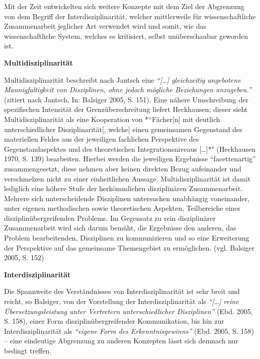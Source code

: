\documentclass[a4paper,
fontsize=11pt,
oneside,
numbers=noperiodatend,
parskip=half-,
bibliography=totoc,
final
]{scrartcl}
\begin{document}
Mit der Zeit entwickelten sich weitere Konzepte mit dem Ziel der
Abgrenzung von dem Begriff der Interdisziplinarität, welcher
mittlerweile für wissenschaftliche Zusammenarbeit jeglicher Art
verwendet wird und somit, wie das wissenschaftliche System, welches es
kritisiert, selbst unüberschaubar geworden ist.

\textbf{Multidisziplinarität}

Multidisziplinarität beschreibt nach Jantsch eine
\emph{\enquote{{[}\ldots{}{]} gleichzeitig angebotene Mannigfaltigkeit
von Disziplinen, ohne jedoch mögliche Beziehungen anzugeben.}} (zitiert
nach Jantsch, In: Balsiger 2005, S. 151). Eine nähere Umschreibung der
spezifischen Intensität der Grenzüberschreitung liefert Heckhausen;
dieser sieht Multidisziplinarität als eine Kooperation von
*``Fächer{[}n{]} mit deutlich unterschiedlicher Disziplinarität{[},
welche{]} einen gemeinsamen Gegenstand des materiellen Feldes aus der
jeweiligen fachlichen Perspektive des Gegenstandaspektes und des
theoretischen Integrationsniveaus {[}\ldots{}{]}*" (Heckhausen 1970, S.
139) bearbeiten. Hierbei werden die jeweiligen Ergebnisse
\enquote{facettenartig} zusammengesetzt, diese nehmen aber keinen
direkten Bezug aufeinander und verschmelzen nicht zu einer einheitlichen
Aussage. Multidisziplinarität ist damit lediglich eine höhere Stufe der
herkömmlichen disziplinären Zusammenarbeit. Mehrere sich unterscheidende
Disziplinen untersuchen unabhängig voneinander, unter eigenen
methodischen sowie theoretischen Aspekten, Teilbereiche eines
disziplinübergreifenden Problems. Im Gegensatz zu rein disziplinärer
Zusammenarbeit wird sich darum bemüht, die Ergebnisse den anderen, das
Problem bearbeitenden, Disziplinen zu kommunizieren und so eine
Erweiterung der Perspektive auf das gemeinsame Themengebiet zu
ermöglichen. (vgl. Balsiger 2005, S. 152)

\textbf{Interdisziplinarität}

Die Spannweite des Verständnisses von Interdisziplinarität ist sehr
breit und reicht, so Balsiger, von der Vorstellung der
Interdisziplinarität als \emph{\enquote{{[}\ldots{}{]} reine
Übersetzungsleistung unter Vertretern unterschiedlicher Disziplinen}}
(Ebd. 2005, S. 158), einer Form disziplinübergreifender Kommunikation,
bis hin zur Interdisziplinarität als \emph{\enquote{eigene Form des
Erkenntnisgewinns}} (Ebd. 2005, S. 158) -- eine eindeutige Abgrenzung zu
anderen Konzepten lässt sich demnach nur bedingt treffen.
\end{document}
